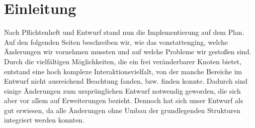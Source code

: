 \chapter{Einleitung}
Nach Pflichtenheft und Entwurf stand nun die Implementierung auf dem Plan.
Auf den folgenden Seiten beschreiben wir, wie das vonstattenging, welche Änderungen wir vornehmen mussten und auf welche Probleme wir gestoßen sind.
Durch die vielfältigen Möglichkeiten, die ein frei veränderbarer Knoten bietet, entstand eine hoch komplexe Interaktionsvielfalt,
von der manche Bereiche im Entwurf nicht ausreichend Beachtung fanden, bzw. finden konnte.
Dadurch sind einige Änderungen zum ursprünglichen Entwurf notwendig geworden, die sich aber vor allem auf Erweiterungen bezieht.
Dennoch hat sich unser Entwurf als gut erwiesen, da alle Änderungen ohne Umbau der grundlegenden Strukturen integriert werden konnten.
